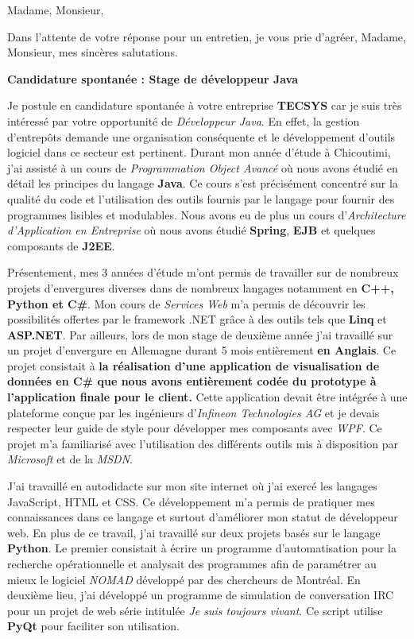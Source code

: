 \date{\today}
\opening{Madame, Monsieur,}
\closing{Dans l'attente de votre réponse pour un entretien, je vous prie d'agréer, Madame, Monsieur, mes sincères salutations.}

\makelettertitle

\textbf{Candidature spontanée : Stage de développeur Java}

\introduction{}
Je postule en candidature spontanée à votre entreprise \textbf{TECSYS} car je suis très intéressé par votre opportunité de \textit{Développeur Java}. En effet, la gestion d'entrepôts demande une organisation conséquente et le développement d'outils logiciel dans ce secteur est pertinent. Durant mon année d'étude à Chicoutimi, j'ai assisté à un cours de \textit{Programmation Object Avancé} où nous avons étudié en détail les principes du langage \textbf{Java}. Ce cours s'est précisément concentré sur la qualité du code et l'utilisation des outils fournis par le langage pour fournir des programmes lisibles et modulables. Nous avons eu de plus un cours d'\textit{Architecture d'Application en Entreprise} où nous avons étudié \textbf{Spring}, \textbf{EJB} et quelques composants de \textbf{J2EE}.

Présentement, mes 3 années d'étude m'ont permis de travailler sur de nombreux projets d'envergures diverses dans de nombreux langages notamment en \textbf{C++, Python et C\#}. Mon cours de \textit{Services Web} m'a permis de découvrir les possibilités offertes par le framework .NET grâce à des outils tels que \textbf{Linq} et \textbf{ASP.NET}. Par ailleurs, lors de mon stage de deuxième année j'ai travaillé sur un projet d'envergure en Allemagne durant 5 mois entièrement \textbf{en Anglais}. Ce projet consistait à \textbf{la réalisation d'une application de visualisation de données en C\# que nous avons entièrement codée du prototype à l'application finale pour le client.} Cette application devait être intégrée à une plateforme conçue par les ingénieurs d'\textit{Infineon Technologies AG} et je devais respecter leur guide de style pour développer mes composants avec \textit{WPF}. Ce projet m'a familiarisé avec l'utilisation des différents outils mis à disposition par \textit{Microsoft} et de la \textit{MSDN}.

J'ai travaillé en autodidacte sur mon site internet où j'ai exercé les langages JavaScript, HTML et CSS. Ce développement m'a permis de pratiquer mes connaissances dans ce langage et surtout d'améliorer mon statut de développeur web. En plus de ce travail, j'ai travaillé sur deux projets basés sur le langage \textbf{Python}. Le premier consistait à écrire un programme d'automatisation pour la recherche opérationnelle et analysait des programmes afin de paramétrer au mieux le logiciel \textit{NOMAD} développé par des chercheurs de Montréal. En deuxième lieu, j'ai développé un programme de simulation de conversation IRC pour un projet de web série intitulée \textit{Je suis toujours vivant}. Ce script utilise \textbf{PyQt} pour faciliter son utilisation. \conclusion{}

\makeletterclosing
